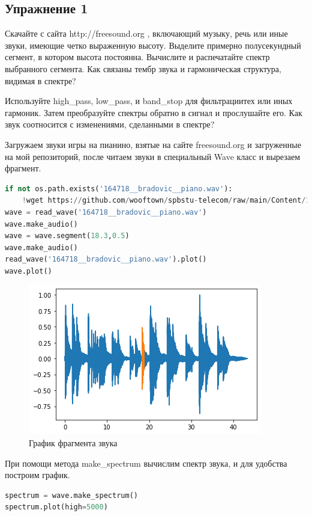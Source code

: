 \subsection{Упражнение 1}

Скачайте с сайта http://freesound.org , включающий музыку, речь или иные звуки, имеющие четко выраженную высоту. Выделите примерно полусекундный сегмент, в котором высота постоянна. Вычислите и распечатайте спектр выбранного сегмента. Как связаны тембр звука и гармоническая структура, видимая в спектре?


\noindent Используйте high\_pass, low\_pass, и band\_stop для фильтрациитех или иных гармоник. Затем преобразуйте спектры обратно в сигнал и прослушайте его. Как звук соотносится с изменениями, сделанными в спектре?
    

Загружаем звуки игры на пианино, взятые на сайте freesound.org и загруженные на мой репозиторий, после читаем звуки в специальный Wave класс и вырезаем фрагмент.

\begin{lstlisting}[language=Python]
if not os.path.exists('164718__bradovic__piano.wav'):
    !wget https://github.com/wooftown/spbstu-telecom/raw/main/Content/164718__bradovic__piano.wav
wave = read_wave('164718__bradovic__piano.wav')
wave.make_audio()
wave = wave.segment(18.3,0.5)
wave.make_audio()
read_wave('164718__bradovic__piano.wav').plot()
wave.plot()
\end{lstlisting}
    
\begin{figure}[H]
	\begin{center}
		\includegraphics[scale=1]{fig/lab01/lab01_9_0.png}
		\caption{График фрагмента звука}
	\end{center}
\end{figure}

При помощи метода make\_spectrum вычислим спектр звука, и для удобства построим график.
\begin{lstlisting}[language=Python]
spectrum = wave.make_spectrum()
spectrum.plot(high=5000)
\end{lstlisting}


